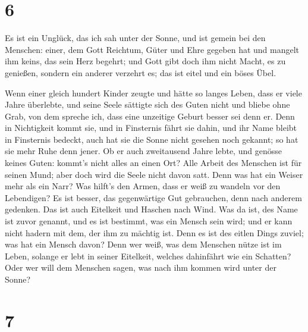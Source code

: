 \hypertarget{section-5}{%
\section{6}\label{section-5}}

 Es ist ein Unglück, das ich sah unter der Sonne, und ist
gemein bei den Menschen:  einer, dem Gott Reichtum, Güter
und Ehre gegeben hat und mangelt ihm keins, das sein Herz begehrt; und
Gott gibt doch ihm nicht Macht, es zu genießen, sondern ein anderer
verzehrt es; das ist eitel und ein böses Übel.

 Wenn einer gleich hundert Kinder zeugte und hätte so
langes Leben, dass er viele Jahre überlebte, und seine Seele sättigte
sich des Guten nicht und bliebe ohne Grab, von dem spreche ich, dass
eine unzeitige Geburt besser sei denn er.  Denn in
Nichtigkeit kommt sie, und in Finsternis fährt sie dahin, und ihr Name
bleibt in Finsternis bedeckt,  auch hat sie die Sonne
nicht gesehen noch gekannt; so hat sie mehr Ruhe denn jener.
 Ob er auch zweitausend Jahre lebte, und genösse keines
Guten: kommt's nicht alles an einen Ort?  Alle Arbeit des
Menschen ist für seinen Mund; aber doch wird die Seele nicht davon satt.
 Denn was hat ein Weiser mehr als ein Narr? Was hilft's
den Armen, dass er weiß zu wandeln vor den Lebendigen?  Es
ist besser, das gegenwärtige Gut gebrauchen, denn nach anderem gedenken.
Das ist auch Eitelkeit und Haschen nach Wind.  Was da
ist, des Name ist zuvor genannt, und es ist bestimmt, was ein Mensch
sein wird; und er kann nicht hadern mit dem, der ihm zu mächtig ist.
 Denn es ist des eitlen Dings zuviel; was hat ein Mensch
davon?  Denn wer weiß, was dem Menschen nütze ist im
Leben, solange er lebt in seiner Eitelkeit, welches dahinfährt wie ein
Schatten? Oder wer will dem Menschen sagen, was nach ihm kommen wird
unter der Sonne?

\hypertarget{section-6}{%
\section{7}\label{section-6}}

